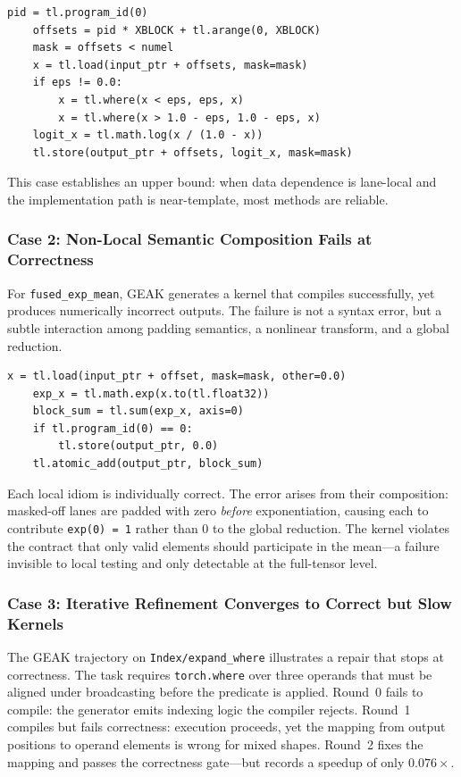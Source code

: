 \begin{lstlisting}[style=papercode,label={lst:logit-autotriton-4090}]
    pid = tl.program_id(0)
    offsets = pid * XBLOCK + tl.arange(0, XBLOCK)
    mask = offsets < numel
    x = tl.load(input_ptr + offsets, mask=mask)
    if eps != 0.0:
        x = tl.where(x < eps, eps, x)
        x = tl.where(x > 1.0 - eps, 1.0 - eps, x)
    logit_x = tl.math.log(x / (1.0 - x))
    tl.store(output_ptr + offsets, logit_x, mask=mask)
\end{lstlisting}

This case establishes an upper bound: when data dependence is lane-local and the implementation path is near-template, most methods are reliable.

\subsubsection{Case 2: Non-Local Semantic Composition Fails at Correctness}
\label{sec:case_global_fail}

For \texttt{fused\_exp\_mean}, GEAK generates a kernel that compiles successfully, yet produces numerically incorrect outputs. The failure is not a syntax error, but a subtle interaction among padding semantics, a nonlinear transform, and a global reduction.

\begin{lstlisting}[style=papercode]
    x = tl.load(input_ptr + offset, mask=mask, other=0.0)
    exp_x = tl.math.exp(x.to(tl.float32))
    block_sum = tl.sum(exp_x, axis=0)
    if tl.program_id(0) == 0:
        tl.store(output_ptr, 0.0)
    tl.atomic_add(output_ptr, block_sum)
\end{lstlisting}

Each local idiom is individually correct. The error arises from their composition: masked-off lanes are padded with zero \emph{before} exponentiation, causing each to contribute \texttt{exp(0)\,=\,1} rather than 0 to the global reduction. The kernel violates the contract that only valid elements should participate in the mean---a failure invisible to local testing and only detectable at the full-tensor level.

\subsubsection{Case 3: Iterative Refinement Converges to Correct but Slow Kernels}
\label{sec:case_iter}

The GEAK trajectory on \texttt{Index/expand\_where} illustrates a repair that stops at correctness. The task requires \texttt{torch.where} over three operands that must be aligned under broadcasting before the predicate is applied. Round~0 fails to compile: the generator emits indexing logic the compiler rejects. Round~1 compiles but fails correctness: execution proceeds, yet the mapping from output positions to operand elements is wrong for mixed shapes. Round~2 fixes the mapping and passes the correctness gate---but records a speedup of only $0.076{\times}$.

